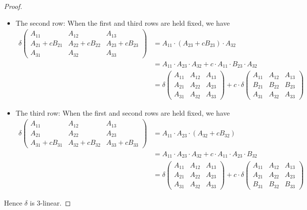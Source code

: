 \begin{proof}
\begin{itemize}
\item The second row: When the first and third rows are held fixed, we have
\begin{align*}
    \delta\begin{pmatrix}
        A_{11} & A_{12} & A_{13} \\
        A_{21}+c B_{21} & A_{22}+c B_{22} & A_{23}+c B_{23} \\
        A_{31} & A_{32} & A_{33}
    \end{pmatrix}
    & = A_{11} \cdot \left( A_{23} + c B_{23} \right) \cdot A_{32} \\
    & = A_{11} \cdot A_{23} \cdot A_{32} + c \cdot A_{11} \cdot B_{23} \cdot A_{32} \\
    & = \delta\begin{pmatrix}
        A_{11} & A_{12} & A_{13} \\
        A_{21} & A_{22} & A_{23} \\
        A_{31} & A_{32} & A_{33}
    \end{pmatrix}
    + c \cdot \delta\begin{pmatrix}
        A_{11} & A_{12} & A_{13} \\
        B_{21} & B_{22} & B_{23} \\
        A_{31} & A_{32} & A_{33}
    \end{pmatrix}
\end{align*}

\item The third row: When the first and second rows are held fixed, we have
\begin{align*}
    \delta\begin{pmatrix}
        A_{11} & A_{12} & A_{13} \\
        A_{21} & A_{22} & A_{23} \\
        A_{31}+c B_{31} & A_{32}+c B_{32} & A_{33}+c B_{33}
    \end{pmatrix}
    & = A_{11} \cdot A_{23} \cdot \left( A_{32} + c B_{32} \right) \\
    & = A_{11} \cdot A_{23} \cdot A_{32} + c \cdot A_{11} \cdot A_{23} \cdot B_{32} \\
    & = \delta\begin{pmatrix}
        A_{11} & A_{12} & A_{13} \\
        A_{21} & A_{22} & A_{23} \\
        A_{31} & A_{32} & A_{33}
    \end{pmatrix}
    + c \cdot \delta\begin{pmatrix}
        A_{11} & A_{12} & A_{13} \\
        A_{21} & A_{22} & A_{23} \\
        B_{31} & B_{32} & B_{33}
    \end{pmatrix}
\end{align*}
\end{itemize}
Hence \(\delta\) is \(3\)-linear.
\end{proof}

